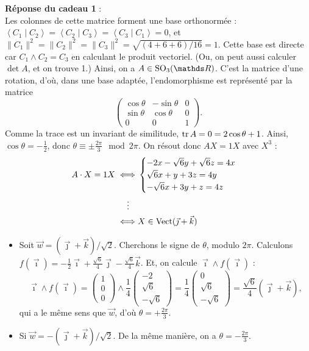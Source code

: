 \documentclass[a4paper]{article}
\begin{document}
	\textbf{Réponse du cadeau 1} :\\
	Les colonnes de cette matrice forment une base orthonormée : $\left<C_1  \mid C_2 \right> = \left<C_2  \mid C_3 \right> = \left<C_3  \mid C_1 \right> = 0$, et $\|C_1\|^2 = \|C_2\|^2 = \|C_3\|^2 = \sqrt{(4 + 6 + 6) / 16} = 1$.
	Cette base est directe car $C_1 \land C_2 = C_3$\/ en calculant le produit vectoriel.
	(Ou, on peut aussi calculer $\det A$, et on trouve 1.)
	Ainsi, on a $A \in \mathrm{SO}_3(\R)$. C'est la matrice d'une rotation, d'où, dans une base adaptée, l'endomorphisme est représenté par la matrice \[
		\begin{pmatrix}
			\cos \theta & -\sin \theta & 0\\
			\sin \theta & \cos \theta & 0\\
			0 & 0 & 1
		\end{pmatrix} 
	.\] Comme la trace est un invariant de similitude, $\operatorname{tr} A = 0 = 2\cos \theta + 1$.
	Ainsi, $\cos \theta = -\frac{1}{2}$, donc $\theta \equiv \pm \frac{2\pi}{3}\mod{2\pi}$.
	On résout donc $AX = 1X$\/ avec $X^3$ :
	\begin{align*}
		A\cdot X = 1X \iff& \begin{cases}
			-2x - \sqrt{6}y + \sqrt{6} z = 4x\\
			\sqrt{6}x + y + 3z = 4y\\
			-\sqrt{6}x + 3y + z = 4z
		\end{cases} \\
		\vdots\quad& \\
		\iff& X \in \operatorname{Vect}(\vec{\jmath} + \vec{k}) \\
	\end{align*}
	\begin{itemize}
		\item Soit $\vec{w} = (\vec{\jmath}+\vec{k}) / \sqrt{2}$. Cherchons le signe de $\theta$, modulo $2\pi$.
			Calculons $f(\vec{\imath}) = -\frac{1}{2} \vec{\imath} + \frac{\sqrt{6}}{4} \vec{\jmath} - \frac{\sqrt 6}{4} \vec{k}$.
			Et, on calcule $\vec{\imath} \land f(\vec{\imath})$\/ : \[
				\vec{\imath} \land f(\vec{\imath}) = \begin{pmatrix} 1 \\ 0 \\ 0 \end{pmatrix} \land \frac{1}{4} \begin{pmatrix} -2 \\ \sqrt{6} \\ -\sqrt{6} \end{pmatrix} = \frac{1}{4}\begin{pmatrix} 0\\ \sqrt{6}\\ -\sqrt{6} \end{pmatrix} = \frac{\sqrt{6}}{4} (\vec{\jmath} + \vec{k})
			,\] qui a le même sens que $\vec{w}$, d'où $\theta = +\frac{2\pi}{3}$.
		\item Si $\vec{w} = -(\vec{\jmath} + \vec{k}) / \sqrt{2}$. De la même manière, on a $\theta = - \frac{2\pi}{3}$.
	\end{itemize}
\end{document}
